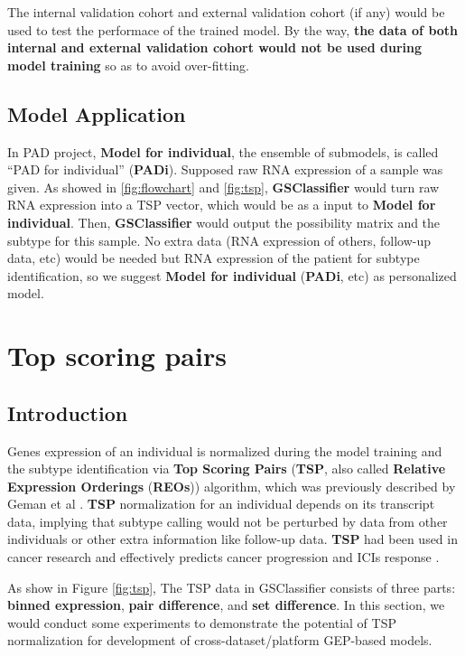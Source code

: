 \documentclass[
  12pt,
]{book}
\begin{document}
The internal validation cohort and external validation cohort (if any) would be used to test the performace of the trained model. By the way, \textbf{the data of both internal and external validation cohort would not be used during model training} so as to avoid over-fitting.

\hypertarget{model-application}{%
\subsection{Model Application}\label{model-application}}

In PAD project, \textbf{Model for individual}, the ensemble of submodels, is called ``PAD for individual'' (\textbf{PADi}). Supposed raw RNA expression of a sample was given. As showed in \ref{fig:flowchart} and \ref{fig:tsp}, \textbf{GSClassifier} would turn raw RNA expression into a TSP vector, which would be as a input to \textbf{Model for individual}. Then, \textbf{GSClassifier} would output the possibility matrix and the subtype for this sample. No extra data (RNA expression of others, follow-up data, etc) would be needed but RNA expression of the patient for subtype identification, so we suggest \textbf{Model for individual} (\textbf{PADi}, etc) as personalized model.

\hypertarget{topicTSP}{%
\section{Top scoring pairs}\label{topicTSP}}

\hypertarget{tsp-intro}{%
\subsection{Introduction}\label{tsp-intro}}

Genes expression of an individual is normalized during the model training and the subtype identification via \textbf{Top Scoring Pairs} (\textbf{TSP}, also called \textbf{Relative Expression Orderings} (\textbf{REOs})) algorithm, which was previously described by Geman et al \citep{RN267}. \textbf{TSP} normalization for an individual depends on its transcript data, implying that subtype calling would not be perturbed by data from other individuals or other extra information like follow-up data. \textbf{TSP} had been used in cancer research and effectively predicts cancer progression and ICIs response \citep{RN265, RN266, RN261}.

As show in Figure \ref{fig:tsp}, The TSP data in GSClassifier consists of three parts: \textbf{binned expression}, \textbf{pair difference}, and \textbf{set difference}. In this section, we would conduct some experiments to demonstrate the potential of TSP normalization for development of cross-dataset/platform GEP-based models.
\end{document}
